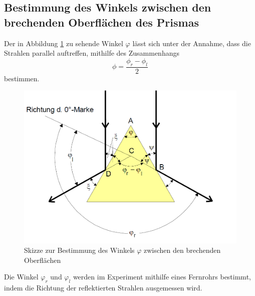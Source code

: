 \subsection{Bestimmung des Winkels zwischen den brechenden Oberflächen des Prismas} \label{sec:MessPhi}
Der in Abbildung \ref{fig:Messphi} zu sehende Winkel $\varphi$ lässt sich unter der Annahme, dass die Strahlen parallel auftreffen, mithilfe des Zusammenhangs
\begin{equation}
  \phi = \frac{\phi_r -\phi_l}{2} \label{eq:phi}
  \end{equation}
bestimmen.
\begin{figure}
  \centering
  \includegraphics[scale=0.35]{text/Bilder/MessPhi.png}
  \caption{Skizze zur Bestimmung des Winkels $\varphi$ zwischen den brechenden Oberflächen \cite[26]{sample} }
  \label{fig:Messphi}
\end{figure}
Die Winkel $\varphi_r$ und $\varphi_l$ werden im Experiment mithilfe eines Fernrohrs bestimmt, indem die Richtung der reflektierten Strahlen ausgemessen wird.

